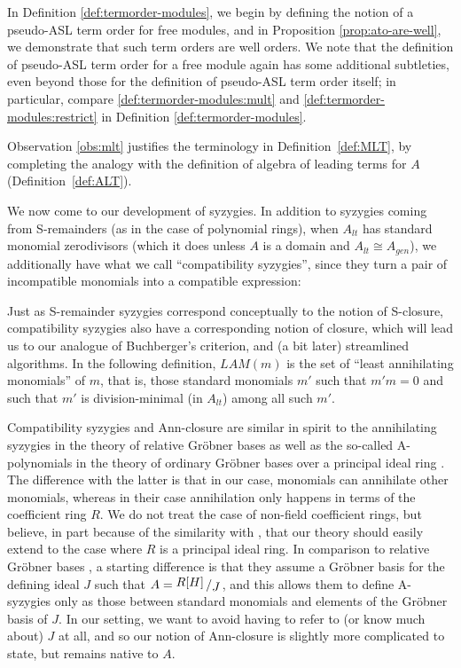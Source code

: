 \documentclass[11pt,reqno]{amsart}
\newcommand{\bigslant}[2]{{\raisebox{.2em}{$#1$}\left/\raisebox{-.2em}{$#2$}\right.}}
\theoremstyle{definition}
\numberwithin{equation}{section}
\begin{document}
In Definition \ref{def:termorder-modules}, we begin by defining the notion of a pseudo-ASL term order for free modules, and in Proposition \ref{prop:ato-are-well}, we demonstrate that such term orders are well orders. We note that the definition of pseudo-ASL term order for a free module again has some additional subtleties, even beyond those for the definition of pseudo-ASL term order itself; in particular, compare \ref{def:termorder-modules:mult} and \ref{def:termorder-modules:restrict} in Definition \ref{def:termorder-modules}.


Observation \ref{obs:mlt} justifies the terminology in Definition~\ref{def:MLT}, by completing the analogy with the definition of algebra of leading terms for $A$ (Definition~\ref{def:ALT}).


We now come to our development of syzygies. In addition to syzygies coming from S-remainders (as in the case of polynomial rings), when $A_{lt}$ has standard monomial zerodivisors (which it does unless $A$ is a domain and $A_{lt} \cong A_{gen}$), we additionally have what we call ``compatibility syzygies'', since they turn a pair of incompatible monomials into a compatible expression:


Just as S-remainder syzygies correspond conceptually to the notion of S-closure, compatibility syzygies also have a corresponding notion of closure, which will lead us to our analogue of Buchberger's criterion, and (a bit later) streamlined algorithms. In the following definition, $LAM(m)$ is the set of ``least annihilating monomials'' of $m$, that is, those standard monomials $m'$ such that $m' m = 0$ and such that $m'$ is division-minimal (in $A_{lt}$) among all such $m'$.


\begin{remark} 
\label{rmk:compare-ann}
Compatibility syzygies and Ann-closure are similar in spirit to the annihilating syzygies in the theory of relative Gröbner bases \cite{HOS} as well as the so-called A-polynomials in the theory of ordinary Gröbner bases over a principal ideal ring \cite[Theorem~4.6]{NS}. The difference with the latter is that in our case, monomials can annihilate other monomials, whereas in their case annihilation only happens in terms of the coefficient ring $R$. We do not treat the case of non-field coefficient rings, but believe, in part because of the similarity with \cite[Theorem~4.6]{NS}, that our theory should easily extend to the case where $R$ is a principal ideal ring. In comparison to relative Gröbner bases \cite{HOS}, a starting difference is that they assume a Gröbner basis for the defining ideal $J$ such that $A = \bigslant{R[H]}{J}$, and this allows them to define A-syzygies only as those between standard monomials and elements of the Gröbner basis of $J$. In our setting, we want to avoid having to refer to (or know much about) $J$ at all, and so our notion of Ann-closure is slightly more complicated to state, but remains native to $A$.
\end{remark}
\end{document}
